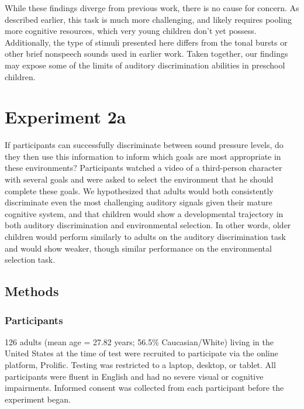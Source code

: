 \documentclass[10pt, letterpaper]{article}
\begin{document}
While these findings diverge from previous work, there is no cause for
concern. As described earlier, this task is much more challenging, and
likely requires pooling more cognitive resources, which very young
children don't yet possess. Additionally, the type of stimuli presented
here differs from the tonal bursts or other brief nonspeech sounds used
in earlier work. Taken together, our findings may expose some of the
limits of auditory discrimination abilities in preschool children.

\hypertarget{experiment-2a}{%
\section{Experiment 2a}\label{experiment-2a}}

If participants can successfully discriminate between sound pressure
levels, do they then use this information to inform which goals are most
appropriate in these environments? Participants watched a video of a
third-person character with several goals and were asked to select the
environment that he should complete these goals. We hypothesized that
adults would both consistently discriminate even the most challenging
auditory signals given their mature cognitive system, and that children
would show a developmental trajectory in both auditory discrimination
and environmental selection. In other words, older children would
perform similarly to adults on the auditory discrimination task and
would show weaker, though similar performance on the environmental
selection task.

\hypertarget{methods-2}{%
\subsection{Methods}\label{methods-2}}

\hypertarget{participants-2}{%
\subsubsection{Participants}\label{participants-2}}

126 adults (mean age = 27.82 years; 56.5\% Caucasian/White) living in
the United States at the time of test were recruited to participate via
the online platform, Prolific. Testing was restricted to a laptop,
desktop, or tablet. All participants were fluent in English and had no
severe visual or cognitive impairments. Informed consent was collected
from each participant before the experiment began.
\end{document}
